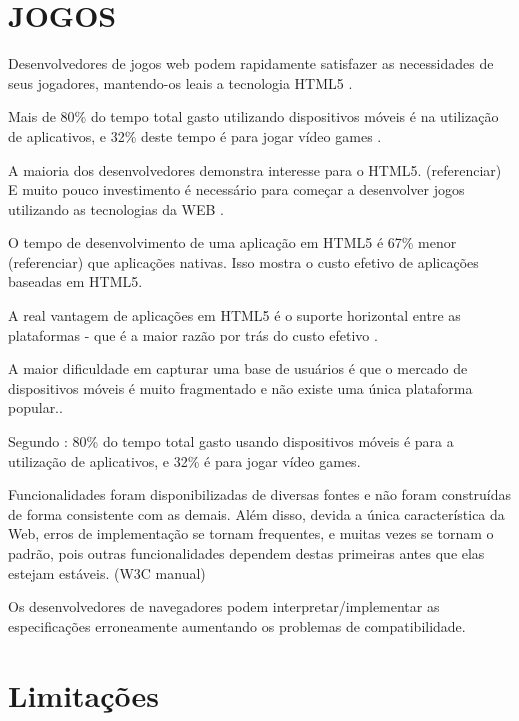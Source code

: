 
\section{JOGOS}

Desenvolvedores de jogos web podem rapidamente satisfazer as
necessidades de seus jogadores, mantendo-os leais a tecnologia HTML5
\autocite{developingEffect}.

Mais de 80\% do tempo total gasto utilizando dispositivos móveis é na utilização de aplicativos, e 32\%  deste tempo é para jogar vídeo games \autocite{HTML5CrossPlatformGameDevelopment}.

A maioria dos desenvolvedores demonstra interesse para o HTML5.
(referenciar) E muito pouco investimento é necessário para começar a desenvolver jogos utilizando as tecnologias da WEB \autocite{html5mostwanted}.

O tempo de desenvolvimento de uma aplicação em HTML5 é 67\% menor
(referenciar) que aplicações nativas. Isso mostra o custo efetivo de
aplicações baseadas em HTML5.

A real vantagem de aplicações em HTML5 é o suporte horizontal entre
as plataformas - que é a maior razão por trás do custo efetivo \autocite{html5Tradeoffs}.

A maior dificuldade em capturar uma base de usuários é que o mercado
de dispositivos móveis é muito fragmentado e não existe uma única
plataforma popular.\autocite{html5Tradeoffs}.

Segundo \cite{HTML5CrossPlatformGameDevelopment}: 80\% do tempo total
gasto usando dispositivos móveis é para a utilização de aplicativos,
e 32\% é para jogar vídeo games.

Funcionalidades foram disponibilizadas de diversas fontes e não foram
construídas de forma consistente com as demais. Além disso,
devida a única característica da Web, erros de implementação se
tornam frequentes, e muitas vezes se tornam o padrão, pois outras
funcionalidades dependem destas primeiras antes que elas estejam
estáveis. (W3C manual)

Os desenvolvedores de navegadores podem interpretar/implementar
as especificações erroneamente aumentando os problemas de
compatibilidade.

\section{Limitações}

